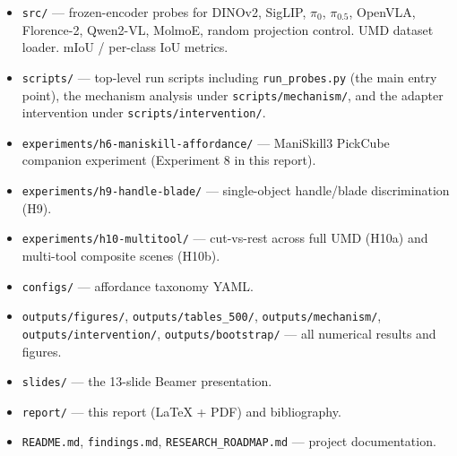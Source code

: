 \documentclass[11pt]{article}
\begin{document}
\begin{itemize}[leftmargin=1.3em, itemsep=0.0em, topsep=0.2em]
\item \verb|src/| --- frozen-encoder probes for DINOv2, SigLIP, $\pi_0$,
$\pi_{0.5}$, OpenVLA, Florence-2, Qwen2-VL, MolmoE, random projection
control. UMD dataset loader. mIoU / per-class IoU metrics.
\item \verb|scripts/| --- top-level run scripts including
\verb|run_probes.py| (the main entry point), the mechanism analysis
under \verb|scripts/mechanism/|, and the adapter intervention under
\verb|scripts/intervention/|.
\item \verb|experiments/h6-maniskill-affordance/| --- ManiSkill3
PickCube companion experiment (Experiment 8 in this report).
\item \verb|experiments/h9-handle-blade/| ---
single-object handle/blade discrimination (H9).
\item \verb|experiments/h10-multitool/| --- cut-vs-rest
across full UMD (H10a) and multi-tool composite scenes (H10b).
\item \verb|configs/| --- affordance taxonomy YAML.
\item \verb|outputs/figures/|, \verb|outputs/tables_500/|,
\verb|outputs/mechanism/|, \verb|outputs/intervention/|,
\verb|outputs/bootstrap/| --- all numerical results and figures.
\item \verb|slides/| --- the 13-slide Beamer presentation.
\item \verb|report/| --- this report (LaTeX + PDF) and bibliography.
\item \verb|README.md|, \verb|findings.md|, \verb|RESEARCH_ROADMAP.md| --- project documentation.
\end{itemize}



\end{document}
